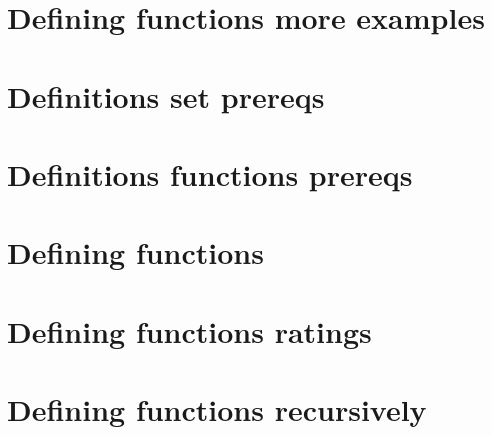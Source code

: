 
\section*{Defining functions more examples}

\vfill
\section*{Definitions set prereqs}

\vfill
\section*{Definitions functions prereqs}

\vfill
\section*{Defining functions}

\vfill
\section*{Defining functions ratings}

\vfill
\section*{Defining functions recursively}

\vfill
